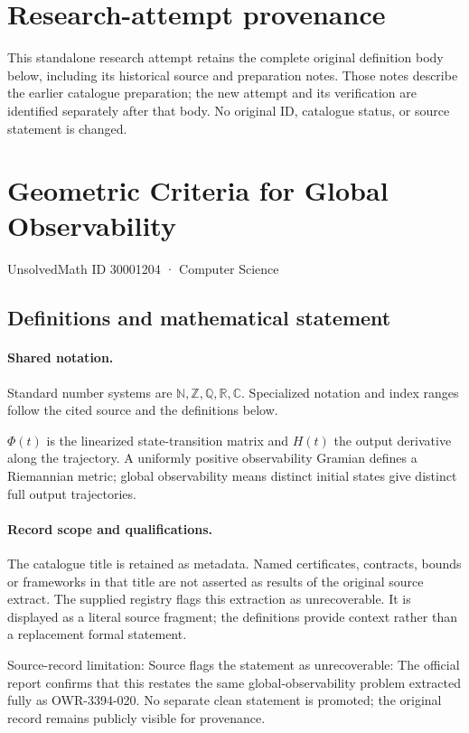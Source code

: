 \documentclass[11pt]{article}
\begin{document}
\section*{Research-attempt provenance}
This standalone research attempt retains the complete original definition body below,
including its historical source and preparation notes. Those notes describe the
earlier catalogue preparation; the new attempt and its verification are identified
separately after that body. No original ID, catalogue status, or source statement is changed.

\section{Geometric Criteria for Global Observability}\label{30001204}
{\small UnsolvedMath ID 30001204 · Computer Science}
\subsection{Definitions and mathematical statement}

\paragraph{Shared notation.}Standard number systems are $\mathbb N,\mathbb Z,\mathbb Q,\mathbb R,\mathbb C$. Specialized notation and index ranges follow the cited source and the definitions below.


$\Phi(t)$ is the linearized state-transition matrix and $H(t)$ the output derivative along the trajectory. A uniformly positive observability Gramian defines a Riemannian metric; global observability means distinct initial states give distinct full output trajectories.
\paragraph{Record scope and qualifications.}
The catalogue title is retained as metadata. Named certificates, contracts, bounds or frameworks in that title are not asserted as results of the original source extract.
The supplied registry flags this extraction as unrecoverable. It is displayed as a literal source fragment; the definitions provide context rather than a replacement formal statement.

Source-record limitation: Source flags the statement as unrecoverable: The official report confirms that this restates the same global-observability problem extracted fully as OWR-3394-020. No separate clean statement is promoted; the original record remains publicly visible for provenance.
\end{document}
